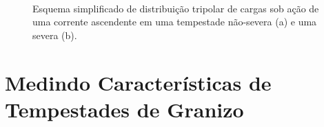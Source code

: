 \begin{figure}[htb]
	\begin{center}
		\caption{Esquema simplificado de distribuição tripolar de cargas sob ação de uma corrente ascendente em uma tempestade não-severa (a) e uma severa (b).} 
		\label{esquema_tripolar}
		 \\
	\end{center}
\end{figure}

\section{Medindo Características de Tempestades de Granizo}

